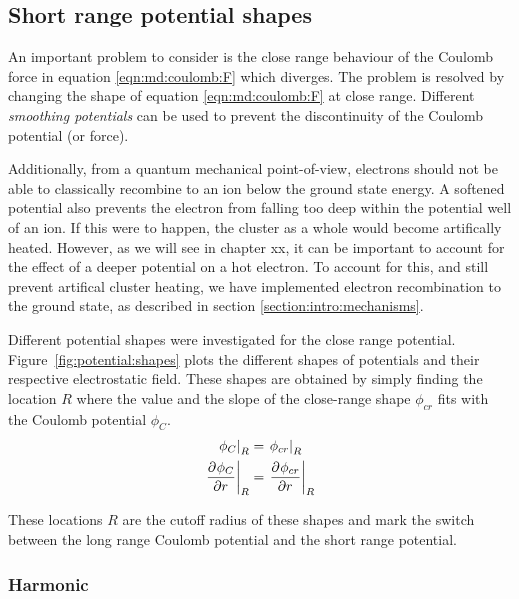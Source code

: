 \subsection{Short range potential shapes}
\label{section:intro:md:potentials}



An important problem to consider is the close range behaviour 
%
of the Coulomb force 
%
in equation
\eqref{eqn:md:coulomb:F} which diverges. The problem is resolved by
changing the shape of equation \eqref{eqn:md:coulomb:F} at close range.
Different \textit{smoothing potentials} can be used to prevent the
discontinuity of the Coulomb potential (or force).

Additionally, from a quantum mechanical point-of-view, electrons should not be
able to classically recombine to an ion below the ground state energy. 
A softened potential also prevents the electron from falling too deep within the potential well of an ion. If this were to happen, the cluster as a whole would become artifically heated.
However, as we will see in chapter xx, it can be important to account for the effect of a deeper potential on 
a hot electron. To
account for this, and still prevent artifical cluster heating, we have implemented electron recombination to the ground state, as described in section
\ref{section:intro:mechanisms}.

Different potential shapes were investigated for the close range potential.
Figure~\ref{fig:potential:shapes} plots the different shapes of potentials and
their respective electrostatic field. These shapes are obtained by simply
finding the location $R$ where the value and the slope of the close-range shape
$\phi_{cr}$ fits with the Coulomb potential $\phi_C$.
\begin{subequations}
\begin{align}
\left. \phi_C        \right|_{R} & = \left. \phi_{cr} \right|_{R} \\
\left. \frac{\partial^{{}} \phi_C}{\partial r^{{}}} \right|_{R} & = \left. \frac{\partial^{{}} \phi_{cr}}{\partial r^{{}}} \right|_{R}
\end{align}
\label{eqn:potential:to_match}
\end{subequations}

These locations $R$ are the cutoff radius of these shapes and mark the switch
between the long range Coulomb potential and the short range potential.


\subsubsection{Harmonic}


